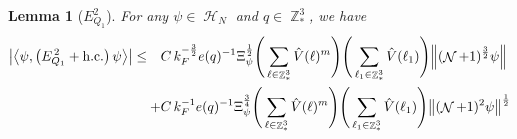 \documentclass[sn-mathphys, Numbered ,a4paper]{sn-jnl}%
\DeclareMathOperator{\Z}{\mathbb{Z}}
\DeclareMathOperator{\HH}{\mathcal{H}}
\DeclareMathOperator{\NN}{\mathcal{N}}
\newcommand{\half}{\frac{1}{2}}
\newcommand{\eva}[1]{\left\langle #1 \right\rangle}
\theoremstyle{plain}
\newtheorem{lemma}[theorem]{Lemma}
\theoremstyle{definition}
\theoremstyle{remark}
\theoremstyle{plain}
\theoremstyle{definition}
\theoremstyle{remark}
\begin{document}
\begin{lemma}[$E_{Q_1}^{2}$] \label{lem:EQ121}
For any $\psi \in \HH_N$ and $q \in \Z^3_*$, we have
\begin{alignat}{2}
	\abs{\eva{\psi,\left(E^{\,2}_{Q_1}+\mathrm{h.c.}\right) \psi }}\nonumber
	 \leq \quad &C\,  k_{F}^{-\frac{3}{2}} e(q)^{-1} \Xi_{\psi}^\half \Bigg(\sum\limits_{\ell \in \Z^3_*} \hat{V}(\ell)^m\Bigg)\Bigg( \sum\limits_{\ell_1 \in \Z^3_*} \hat{V}(\ell_1) \Bigg) \norm { (\NN+1)^{\frac{3}{2}} \psi }\\
	\quad+ &C\, k_{F}^{-1} e(q)^{-1} \Xi_{\psi}^{\frac{3}{4}} \Bigg(\sum\limits_{\ell \in \Z^3_*} \hat{V}(\ell)^m\Bigg) \Bigg(\sum\limits_{\ell_1 \in \Z^3_*} \hat{V}(\ell_1) \Bigg)  \norm{ (\NN+1)^2\psi}^\half\label{eq:estEQ121}
\end{alignat}
\end{lemma}
\end{document}
